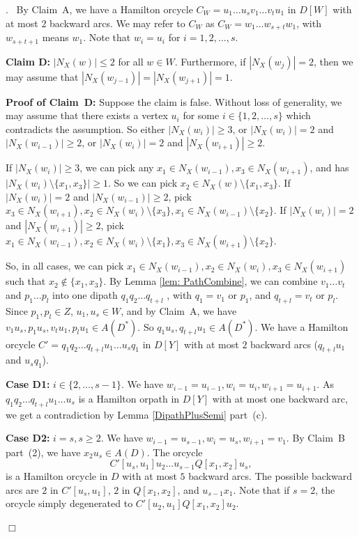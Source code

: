 \documentclass{article}
\newcommand{\2}{\vspace{2mm}}
\renewenvironment{proof}[1][]{\par \noindent {\bf Proof#1}.\ }{\hfill$\Box$
\par \vspace{11pt}}
\theoremstyle{definition}
\begin{document}
\begin{proof}
\2
By Claim~A, we have a Hamilton orcycle $C_W=u_1 \dots u_sv_1 \dots v_tu_1$ in $D[W]$ with at most $2$ backward arcs. We may refer to $C_W$ as $C_W=w_1 \dots w_{s+t}w_1$, with $w_{s+t+1}$ means $w_1$. Note that $w_i=u_i$ for $i=1,2, \dots, s$.

{\bf Claim D:} {$|N_X(w)|\le 2$ for all $w \in W$. Furthermore, if $|N_X(w_j)|= 2$, then we may assume that  $|N_X(w_{j-1})| = |N_X(w_{j+1})|= 1$.}

\2

{\bf Proof of Claim~D:}
Suppose the claim is false. Without loss of generality, we may assume that there exists a vertex $u_i$ for some $i \in \{1,2,\dots,s\}$ which contradicts the assumption. So either $|N_X(w_i)|\ge 3$, or $|N_X(w_i)|= 2$ and $ |N_X(w_{i-1})| \ge 2$, or $|N_X(w_i)|= 2$ and $|N_X(w_{i+1})| \ge 2$.

If $|N_X(w_i)|\ge 3$, we can pick any $x_1 \in N_X(w_{i-1}), x_3 \in N_X(w_{i+1})$, and has $|N_X(w_i)\setminus \{x_1,x_3\}|\ge 1$. So we can pick $x_2 \in N_X(w)\setminus \{x_1,x_3\}$.
If $|N_X(w_i)|= 2$ and $|N_X(w_{i-1})| \ge 2$, pick $x_3 \in N_X(w_{i+1}), x_2 \in N_X(w_i)\setminus \{x_3\}, x_1 \in N_X(w_{i-1}) \setminus \{x_2\}$.
If $|N_X(w_i)|= 2$ and $|N_X(w_{i+1})| \ge 2$, pick $x_1 \in N_X(w_{i-1}), x_2 \in N_X(w_i)\setminus \{x_1\}, x_3 \in N_X(w_{i+1}) \setminus \{x_2\}$.

So, in all cases, we can pick $x_1 \in N_X(w_{i-1}), x_2 \in N_X(w_i), x_3 \in N_X(w_{i+1})$ such that $x_2 \notin \{ x_1,x_3 \}$. By Lemma \ref{lem: PathCombine}, we can combine $v_1 \dots v_t$ and $p_1 \dots p_l$ into one dipath $q_1q_2 \dots q_{t+l}$ , with $q_1= v_1$ or $p_1$, and $q_{t+l}=v_t$ or $p_l$. 
Since $p_1,p_l \in Z$, $u_1,u_s \in W$, and by Claim~A, we have $v_1u_s,p_1u_s,v_tu_1,p_lu_1 \in A(D^*)$.
So $q_1u_s,q_{t+l}u_1 \in A(D^*)$.
We have a Hamilton orcycle $C'=q_1q_2 \dots q_{t+l}u_1\dots u_s q_1$ in $D[Y]$ with at most $2$ backward arcs ($q_{t+l}u_1$ and $u_sq_1$).

\2

\textbf{Case D1:} $i \in \{2,\dots,s-1\}$. 
We have $w_{i-1}=u_{i-1}, w_i=u_i, w_{i+1}=u_{i+1}$. As $q_1q_2 \dots q_{t+l}u_1\dots u_s$ is a Hamilton orpath in $D[Y]$ with at most one backward arc, we get a contradiction by Lemma \ref{DipathPlusSemi} part~(c).

\2

\textbf{Case D2:} $i=s, s \ge 2$. We have $w_{i-1}=u_{s-1}, w_i=u_s, w_{i+1}=v_1$. By Claim~B part~(2), we have $x_2u_s \in A(D)$.
The orcycle
\[
C'[u_s,u_1]u_2 \dots u_{s-1} Q[x_1,x_2]u_s,
\]
is a Hamilton orcycle in $D$ with at most $5$ backward arcs. 
The possible backward arcs are $2$ in $C'[u_s,u_1]$, $2$ in $Q[x_1,x_2]$, and $u_{s-1}x_1$. Note that if $s=2$, the orcycle simply degenerated to $C'[u_2,u_1]Q[x_1,x_2]u_2$.


\end{proof}
\end{document}
